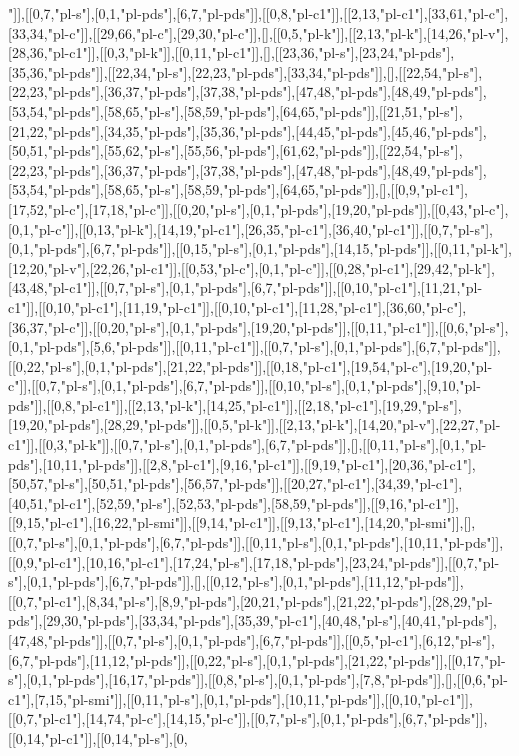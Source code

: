 "]],[[0,7,"pl-s"],[0,1,"pl-pds"],[6,7,"pl-pds"]],[[0,8,"pl-c1"]],[[2,13,"pl-c1"],[33,61,"pl-c"],[33,34,"pl-c"]],[[29,66,"pl-c"],[29,30,"pl-c"]],[],[[0,5,"pl-k"]],[[2,13,"pl-k"],[14,26,"pl-v"],[28,36,"pl-c1"]],[[0,3,"pl-k"]],[[0,11,"pl-c1"]],[],[[23,36,"pl-s"],[23,24,"pl-pds"],[35,36,"pl-pds"]],[[22,34,"pl-s"],[22,23,"pl-pds"],[33,34,"pl-pds"]],[],[[22,54,"pl-s"],[22,23,"pl-pds"],[36,37,"pl-pds"],[37,38,"pl-pds"],[47,48,"pl-pds"],[48,49,"pl-pds"],[53,54,"pl-pds"],[58,65,"pl-s"],[58,59,"pl-pds"],[64,65,"pl-pds"]],[[21,51,"pl-s"],[21,22,"pl-pds"],[34,35,"pl-pds"],[35,36,"pl-pds"],[44,45,"pl-pds"],[45,46,"pl-pds"],[50,51,"pl-pds"],[55,62,"pl-s"],[55,56,"pl-pds"],[61,62,"pl-pds"]],[[22,54,"pl-s"],[22,23,"pl-pds"],[36,37,"pl-pds"],[37,38,"pl-pds"],[47,48,"pl-pds"],[48,49,"pl-pds"],[53,54,"pl-pds"],[58,65,"pl-s"],[58,59,"pl-pds"],[64,65,"pl-pds"]],[],[[0,9,"pl-c1"],[17,52,"pl-c"],[17,18,"pl-c"]],[[0,20,"pl-s"],[0,1,"pl-pds"],[19,20,"pl-pds"]],[[0,43,"pl-c"],[0,1,"pl-c"]],[[0,13,"pl-k"],[14,19,"pl-c1"],[26,35,"pl-c1"],[36,40,"pl-c1"]],[[0,7,"pl-s"],[0,1,"pl-pds"],[6,7,"pl-pds"]],[[0,15,"pl-s"],[0,1,"pl-pds"],[14,15,"pl-pds"]],[[0,11,"pl-k"],[12,20,"pl-v"],[22,26,"pl-c1"]],[[0,53,"pl-c"],[0,1,"pl-c"]],[[0,28,"pl-c1"],[29,42,"pl-k"],[43,48,"pl-c1"]],[[0,7,"pl-s"],[0,1,"pl-pds"],[6,7,"pl-pds"]],[[0,10,"pl-c1"],[11,21,"pl-c1"]],[[0,10,"pl-c1"],[11,19,"pl-c1"]],[[0,10,"pl-c1"],[11,28,"pl-c1"],[36,60,"pl-c"],[36,37,"pl-c"]],[[0,20,"pl-s"],[0,1,"pl-pds"],[19,20,"pl-pds"]],[[0,11,"pl-c1"]],[[0,6,"pl-s"],[0,1,"pl-pds"],[5,6,"pl-pds"]],[[0,11,"pl-c1"]],[[0,7,"pl-s"],[0,1,"pl-pds"],[6,7,"pl-pds"]],[[0,22,"pl-s"],[0,1,"pl-pds"],[21,22,"pl-pds"]],[[0,18,"pl-c1"],[19,54,"pl-c"],[19,20,"pl-c"]],[[0,7,"pl-s"],[0,1,"pl-pds"],[6,7,"pl-pds"]],[[0,10,"pl-s"],[0,1,"pl-pds"],[9,10,"pl-pds"]],[[0,8,"pl-c1"]],[[2,13,"pl-k"],[14,25,"pl-c1"]],[[2,18,"pl-c1"],[19,29,"pl-s"],[19,20,"pl-pds"],[28,29,"pl-pds"]],[[0,5,"pl-k"]],[[2,13,"pl-k"],[14,20,"pl-v"],[22,27,"pl-c1"]],[[0,3,"pl-k"]],[[0,7,"pl-s"],[0,1,"pl-pds"],[6,7,"pl-pds"]],[],[[0,11,"pl-s"],[0,1,"pl-pds"],[10,11,"pl-pds"]],[[2,8,"pl-c1"],[9,16,"pl-c1"]],[[9,19,"pl-c1"],[20,36,"pl-c1"],[50,57,"pl-s"],[50,51,"pl-pds"],[56,57,"pl-pds"]],[[20,27,"pl-c1"],[34,39,"pl-c1"],[40,51,"pl-c1"],[52,59,"pl-s"],[52,53,"pl-pds"],[58,59,"pl-pds"]],[[9,16,"pl-c1"]],[[9,15,"pl-c1"],[16,22,"pl-smi"]],[[9,14,"pl-c1"]],[[9,13,"pl-c1"],[14,20,"pl-smi"]],[],[[0,7,"pl-s"],[0,1,"pl-pds"],[6,7,"pl-pds"]],[[0,11,"pl-s"],[0,1,"pl-pds"],[10,11,"pl-pds"]],[[0,9,"pl-c1"],[10,16,"pl-c1"],[17,24,"pl-s"],[17,18,"pl-pds"],[23,24,"pl-pds"]],[[0,7,"pl-s"],[0,1,"pl-pds"],[6,7,"pl-pds"]],[],[[0,12,"pl-s"],[0,1,"pl-pds"],[11,12,"pl-pds"]],[[0,7,"pl-c1"],[8,34,"pl-s"],[8,9,"pl-pds"],[20,21,"pl-pds"],[21,22,"pl-pds"],[28,29,"pl-pds"],[29,30,"pl-pds"],[33,34,"pl-pds"],[35,39,"pl-c1"],[40,48,"pl-s"],[40,41,"pl-pds"],[47,48,"pl-pds"]],[[0,7,"pl-s"],[0,1,"pl-pds"],[6,7,"pl-pds"]],[[0,5,"pl-c1"],[6,12,"pl-s"],[6,7,"pl-pds"],[11,12,"pl-pds"]],[[0,22,"pl-s"],[0,1,"pl-pds"],[21,22,"pl-pds"]],[[0,17,"pl-s"],[0,1,"pl-pds"],[16,17,"pl-pds"]],[[0,8,"pl-s"],[0,1,"pl-pds"],[7,8,"pl-pds"]],[],[[0,6,"pl-c1"],[7,15,"pl-smi"]],[[0,11,"pl-s"],[0,1,"pl-pds"],[10,11,"pl-pds"]],[[0,10,"pl-c1"]],[[0,7,"pl-c1"],[14,74,"pl-c"],[14,15,"pl-c"]],[[0,7,"pl-s"],[0,1,"pl-pds"],[6,7,"pl-pds"]],[[0,14,"pl-c1"]],[[0,14,"pl-s"],[0,
